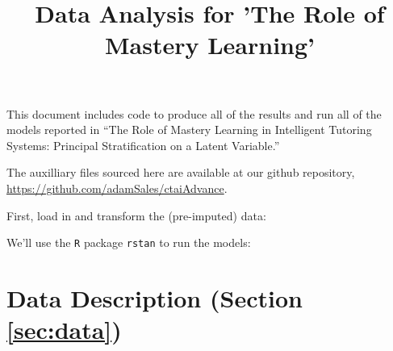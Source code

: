 \documentclass{article}
\title{Data Analysis for 'The Role of Mastery Learning'}
\begin{document}
This document includes code to produce all of the results and run all
of the models reported in ``The Role of Mastery Learning in
Intelligent Tutoring Systems: Principal Stratification on a Latent Variable.''

The auxilliary files sourced here are available at our github repository,
\url{https://github.com/adamSales/ctaiAdvance}.

First, load in and transform the (pre-imputed) data:
\begin{kframe}
\begin{alltt}
\hlstd{(}\hlstd{)}
\hlstd{(}\hlstd{)}
\end{alltt}
\end{kframe}
We'll use the \texttt{R} package \texttt{rstan} to run the models:
\begin{kframe}
\begin{alltt}
\hlstd{(} \hlstd{=} \hlstd{)}
\hlstd{(} \hlopt{::}\hlstd{())}
\end{alltt}
\end{kframe}

\section{Data Description (Section \ref{sec:data})}
\end{document}
